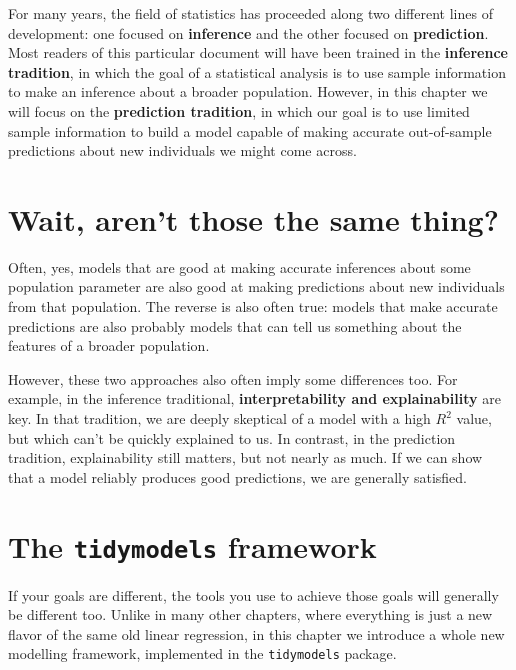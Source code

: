 \documentclass[
]{book}
\begin{document}
For many years, the field of statistics has proceeded along two different lines of development: one focused on \textbf{inference} and the other focused on \textbf{prediction}. Most readers of this particular document will have been trained in the \textbf{inference tradition}, in which the goal of a statistical analysis is to use sample information to make an inference about a broader population. However, in this chapter we will focus on the \textbf{prediction tradition}, in which our goal is to use limited sample information to build a model capable of making accurate out-of-sample predictions about new individuals we might come across.

\hypertarget{wait-arent-those-the-same-thing}{%
\section{Wait, aren't those the same thing?}\label{wait-arent-those-the-same-thing}}

Often, yes, models that are good at making accurate inferences about some population parameter are also good at making predictions about new individuals from that population. The reverse is also often true: models that make accurate predictions are also probably models that can tell us something about the features of a broader population.

However, these two approaches also often imply some differences too. For example, in the inference traditional, \textbf{interpretability and explainability} are key. In that tradition, we are deeply skeptical of a model with a high \(R^2\) value, but which can't be quickly explained to us. In contrast, in the prediction tradition, explainability still matters, but not nearly as much. If we can show that a model reliably produces good predictions, we are generally satisfied.

\hypertarget{the-tidymodels-framework}{%
\section{\texorpdfstring{The \texttt{tidymodels} framework}{The tidymodels framework}}\label{the-tidymodels-framework}}

If your goals are different, the tools you use to achieve those goals will generally be different too. Unlike in many other chapters, where everything is just a new flavor of the same old linear regression, in this chapter we introduce a whole new modelling framework, implemented in the \texttt{tidymodels} package.
\end{document}

